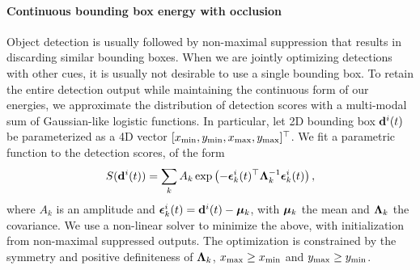 \vspace{-0.3cm}
\paragraph{Continuous bounding box energy with occlusion}
Object detection is usually followed by non-maximal suppression that results in discarding similar bounding boxes. When we are jointly optimizing detections with other cues, it is usually not desirable to use a single bounding box. To retain the entire detection output while maintaining the continuous form of our energies, we approximate the distribution of detection scores with a multi-modal sum of Gaussian-like logistic functions. In particular, let 2D bounding box $\mathbf{d}^{i}(t)$ be parameterized as a 4D vector $[x_{\text{min}}, y_{\text{min}}, x_{\text{max}}, y_{\text{max}}]^\top$. We fit a parametric function to the detection scores, of the form
\begin{equation}
S(\mathbf{d}^{i}(t)) = \sum_k A_k \exp \left( -{\bm{\epsilon}}_k^{i}(t)^\top \bm{\Lambda}_k^{-1} {\bm{\epsilon}}_k^{i}(t) \right),
\label{eq:GMMscores}
\end{equation}
where $A_k$ is an amplitude and ${\bm{\epsilon}}_k^{i}(t) = \mathbf{d}^{i}(t)-{\bm{\mu}}_k$, with ${\bm{\mu}}_k$ the mean and $\bm{\Lambda}_k$ the covariance.
We use a non-linear solver to minimize the above, with initialization from non-maximal suppressed outputs. The optimization is constrained by the symmetry and positive definiteness of $\bm{\Lambda}_k$, $x_{\text{max}} \ge x_{\text{min}}$ and $y_{\text{max}} \ge y_{\text{min}}$.

